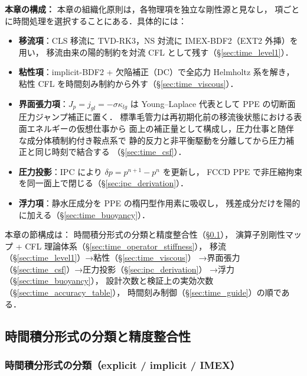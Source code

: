 \noindent\textbf{本章の構成：}
本章の組織化原則は，各物理項を独立な剛性源と見なし，
項ごとに時間処理を選択することにある．具体的には：

\begin{itemize}[leftmargin=2em]
  \item \textbf{移流項}：CLS 移流に TVD-RK3，NS 対流に IMEX-BDF2（EXT2 外挿）を用い，
        移流由来の陽的制約を対流 CFL として残す（§\ref{sec:time_level1}）．
  \item \textbf{粘性項}：implicit-BDF2 + 欠陥補正（DC）で全応力 Helmholtz 系を解き，
        粘性 CFL を時間刻み制約から外す（§\ref{sec:time_viscous}）．
  \item \textbf{界面張力項}：$J_p=j_{gl}=-\sigma\kappa_{lg}$ は
        Young--Laplace 代表として PPE の切断面圧力ジャンプ補正に置く．
        標準毛管力は再初期化前の移流後状態における表面エネルギーの仮想仕事から
        面上の補正量として構成し，圧力仕事と随伴な成分体積制約付き鞍点系で
        静的反力と非平衡駆動を分離してから圧力補正と同じ時刻で結合する
        （§\ref{sec:time_csf}）．
  \item \textbf{圧力投影}：IPC により $\delta p = p^{n+1} - p^n$ を更新し，
        FCCD PPE で非圧縮拘束を同一面上で閉じる（§\ref{sec:ipc_derivation}）．
  \item \textbf{浮力項}：静水圧成分を PPE の楕円型作用素に吸収し，
        残差成分だけを陽的に加える（§\ref{sec:time_buoyancy}）．
\end{itemize}

本章の節構成は：
時間積分形式の分類と精度整合性（§\ref{sec:time_accuracy_principle}），
演算子別剛性マップ + CFL 理論体系（§\ref{sec:time_operator_stiffness}），
移流（§\ref{sec:time_level1}）→粘性（§\ref{sec:time_viscous}）
→界面張力（§\ref{sec:time_csf}）→圧力投影（§\ref{sec:ipc_derivation}）
→浮力（§\ref{sec:time_buoyancy}），
設計次数と検証上の実効次数（§\ref{sec:time_accuracy_table}），
時間刻み制御（§\ref{sec:time_guide}）の順である．

\subsection{時間積分形式の分類と精度整合性}
\label{sec:time_accuracy_principle}

\subsubsection*{時間積分形式の分類（explicit / implicit / IMEX）}
\label{sec:scheme_classification}

